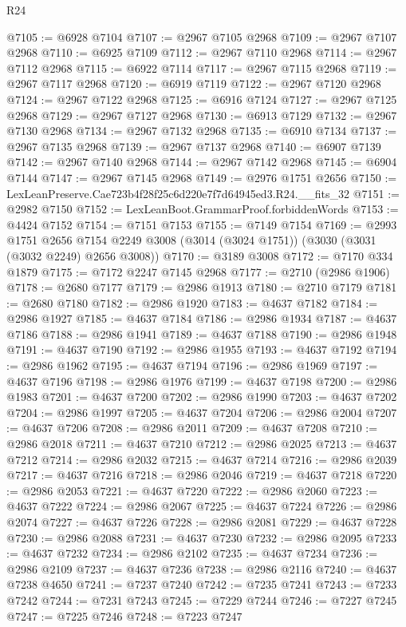 \begin{lexlean}{R24}
\begin{coremodule}
@7105 := @6928 @7104
@7107 := @2967 @7105 @2968
@7109 := @2967 @7107 @2968
@7110 := @6925 @7109
@7112 := @2967 @7110 @2968
@7114 := @2967 @7112 @2968
@7115 := @6922 @7114
@7117 := @2967 @7115 @2968
@7119 := @2967 @7117 @2968
@7120 := @6919 @7119
@7122 := @2967 @7120 @2968
@7124 := @2967 @7122 @2968
@7125 := @6916 @7124
@7127 := @2967 @7125 @2968
@7129 := @2967 @7127 @2968
@7130 := @6913 @7129
@7132 := @2967 @7130 @2968
@7134 := @2967 @7132 @2968
@7135 := @6910 @7134
@7137 := @2967 @7135 @2968
@7139 := @2967 @7137 @2968
@7140 := @6907 @7139
@7142 := @2967 @7140 @2968
@7144 := @2967 @7142 @2968
@7145 := @6904 @7144
@7147 := @2967 @7145 @2968
@7149 := @2976 @1751 @2656
@7150 := LexLeanPreserve.Cae723b4f28f25c6d220e7f7d64945ed3.R24.__fits_32
@7151 := @2982 @7150
@7152 := LexLeanBoot.GrammarProof.forbiddenWords
@7153 := @4424 @7152
@7154 := @7151 @7153
@7155 := @7149 @7154
@7169 := @2993
    @1751
    @2656
    @7154
    @2249
    @3008
    (@3014 (@3024 @1751))
    (@3030 (@3031 (@3032 @2249) @2656 @3008))
@7170 := @3189 @3008
@7172 := @7170 @334 @1879
@7175 := @7172 @2247 @7145 @2968
@7177 := @2710 (@2986 @1906)
@7178 := @2680 @7177
@7179 := @2986 @1913
@7180 := @2710 @7179
@7181 := @2680 @7180
@7182 := @2986 @1920
@7183 := @4637 @7182
@7184 := @2986 @1927
@7185 := @4637 @7184
@7186 := @2986 @1934
@7187 := @4637 @7186
@7188 := @2986 @1941
@7189 := @4637 @7188
@7190 := @2986 @1948
@7191 := @4637 @7190
@7192 := @2986 @1955
@7193 := @4637 @7192
@7194 := @2986 @1962
@7195 := @4637 @7194
@7196 := @2986 @1969
@7197 := @4637 @7196
@7198 := @2986 @1976
@7199 := @4637 @7198
@7200 := @2986 @1983
@7201 := @4637 @7200
@7202 := @2986 @1990
@7203 := @4637 @7202
@7204 := @2986 @1997
@7205 := @4637 @7204
@7206 := @2986 @2004
@7207 := @4637 @7206
@7208 := @2986 @2011
@7209 := @4637 @7208
@7210 := @2986 @2018
@7211 := @4637 @7210
@7212 := @2986 @2025
@7213 := @4637 @7212
@7214 := @2986 @2032
@7215 := @4637 @7214
@7216 := @2986 @2039
@7217 := @4637 @7216
@7218 := @2986 @2046
@7219 := @4637 @7218
@7220 := @2986 @2053
@7221 := @4637 @7220
@7222 := @2986 @2060
@7223 := @4637 @7222
@7224 := @2986 @2067
@7225 := @4637 @7224
@7226 := @2986 @2074
@7227 := @4637 @7226
@7228 := @2986 @2081
@7229 := @4637 @7228
@7230 := @2986 @2088
@7231 := @4637 @7230
@7232 := @2986 @2095
@7233 := @4637 @7232
@7234 := @2986 @2102
@7235 := @4637 @7234
@7236 := @2986 @2109
@7237 := @4637 @7236
@7238 := @2986 @2116
@7240 := @4637 @7238 @4650
@7241 := @7237 @7240
@7242 := @7235 @7241
@7243 := @7233 @7242
@7244 := @7231 @7243
@7245 := @7229 @7244
@7246 := @7227 @7245
@7247 := @7225 @7246
@7248 := @7223 @7247

\end{coremodule}
\end{lexlean}
